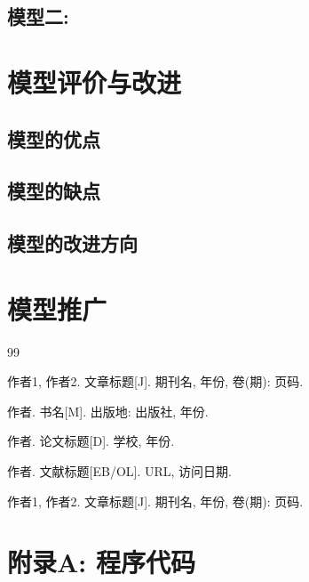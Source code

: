 \documentclass[12pt,a4paper]{article}
\begin{document}
\subsection{模型二: \underline{\hspace{3cm}}}

\section{模型评价与改进}

\subsection{模型的优点}
\subsection{模型的缺点}
\subsection{模型的改进方向}

\section{模型推广}

\begin{thebibliography}{99}

 作者1, 作者2. 文章标题[J]. 期刊名, 年份, 卷(期): 页码.

 作者. 书名[M]. 出版地: 出版社, 年份.

 作者. 论文标题[D]. 学校, 年份.

 作者. 文献标题[EB/OL]. URL, 访问日期.

 作者1, 作者2. 文章标题[J]. 期刊名, 年份, 卷(期): 页码.

\end{thebibliography}

\newpage
\appendix
\section{附录A: 程序代码}

\end{document}
